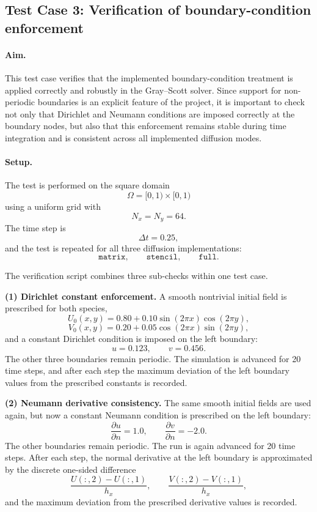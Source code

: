 \subsection{Test Case 3: Verification of boundary-condition enforcement}
\label{sec:verification_testcase_boundary_conditions}

\paragraph{Aim.}
This test case verifies that the implemented boundary-condition treatment is applied correctly and robustly in the Gray--Scott solver. Since support for non-periodic boundaries is an explicit feature of the project, it is important to check not only that Dirichlet and Neumann conditions are imposed correctly at the boundary nodes, but also that this enforcement remains stable during time integration and is consistent across all implemented diffusion modes.

\paragraph{Setup.}
The test is performed on the square domain
\[
\Omega = [0,1)\times[0,1)
\]
using a uniform grid with
\[
N_x=N_y=64.
\]
The time step is
\[
\Delta t = 0.25,
\]
and the test is repeated for all three diffusion implementations:
\[
\texttt{matrix}, \qquad \texttt{stencil}, \qquad \texttt{full}.
\]

The verification script combines three sub-checks within one test case.

\medskip
\noindent
\textbf{(1) Dirichlet constant enforcement.}
A smooth nontrivial initial field is prescribed for both species,
\[
U_0(x,y)=0.80+0.10\sin(2\pi x)\cos(2\pi y),
\]
\[
V_0(x,y)=0.20+0.05\cos(2\pi x)\sin(2\pi y),
\]
and a constant Dirichlet condition is imposed on the left boundary:
\[
u = 0.123, \qquad v = 0.456.
\]
The other three boundaries remain periodic. The simulation is advanced for 20 time steps, and after each step the maximum deviation of the left boundary values from the prescribed constants is recorded.

\medskip
\noindent
\textbf{(2) Neumann derivative consistency.}
The same smooth initial fields are used again, but now a constant Neumann condition is prescribed on the left boundary:
\[
\frac{\partial u}{\partial n}=1.0, \qquad \frac{\partial v}{\partial n}=-2.0.
\]
The other boundaries remain periodic. The run is again advanced for 20 time steps. After each step, the normal derivative at the left boundary is approximated by the discrete one-sided difference
\[
\frac{U(:,2)-U(:,1)}{h_x}, \qquad \frac{V(:,2)-V(:,1)}{h_x},
\]
and the maximum deviation from the prescribed derivative values is recorded.

